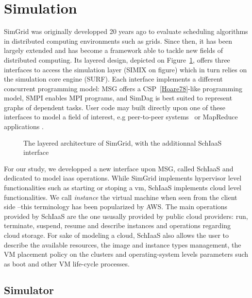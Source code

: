 \section{Simulation}

SimGrid was originally developped 20 years ago to evaluate scheduling algorithms
in distributed  computing environments such as  grids.  Since then, it  has been
largely  extended and  has  become a  framework  able to  tackle  new fields  of
distributed     computing.      Its      layered     design,     depicted     on
Figure~\ref{fg:sg-archi}, offers three interfaces to access the simulation layer
(SIMIX on  figure) which in  turn relies on  the simulation core  engine (SURF).
Each interface implements a different concurrent programming model: MSG offers a
CSP~\ref{Hoare78}-like programming model, SMPI  enables MPI programs, and SimDag
is best  suited to  represent graphs  of dependent tasks.   User code  may built
directly  upon  one of  these  interfaces  to model  a  field  of interest,  e.g
peer-to-peer     systems~\cite{QuinsonRT12}     or    MapReduce     applications
\cite{KolbergMAMGA13}.
\begin{figure}[hbt]

\caption{The  layered  architecture of  SimGrid,  with  the additionnal  SchIaaS
  interface}
\label{fg:sg-archi}
\end{figure}
%
For  our study,  we developped  a  new interface  upon MSG,  called SchIaaS  and
dedicated to  model \ac{iaas}  operations.  While SimGrid  implements hypervisor
level functionalities such as starting  or stoping a \ac{vm}, SchIaaS implements
cloud level functionalities.   We call \emph{instance} the  virtual machine when
seen from  the client side --this  terminology has been popularized  by AWS. The
main operations  provided by  SchIaaS are  the one  ususally provided  by public
cloud  providers: run,  terminate, suspend,  resume and  describe instances  and
operations regarding cloud  storage. For sake of modeling a  cloud, SchIaaS also
allows the  user to  describe the  available resources,  the image  and instance
types management, the  VM placement policy on the  clusters and operating-system
levels parameters such as boot and other VM life-cycle processes.



\subsection{Simulator}

